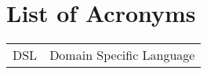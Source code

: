 \section{List of Acronyms}\label{appendix:acronyms}
\begin{longtable}{ll}
DSL & Domain Specific Language\\
\end{longtable}
